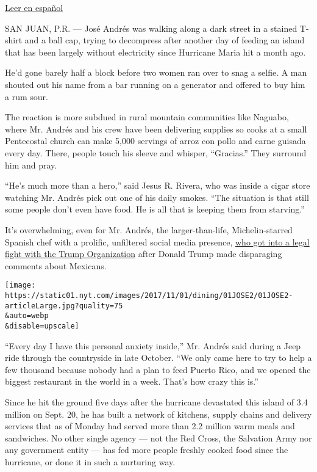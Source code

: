\href{https://www.nytimes.com/es/2017/11/03/los-chefs-que-cambian-como-se-entrega-la-ayuda-posdesastre/}{Leer
en español}

SAN JUAN, P.R. --- José Andrés was walking along a dark street in a
stained T-shirt and a ball cap, trying to decompress after another day
of feeding an island that has been largely without electricity since
Hurricane Maria hit a month ago.

He'd gone barely half a block before two women ran over to snag a
selfie. A man shouted out his name from a bar running on a generator and
offered to buy him a rum sour.

The reaction is more subdued in rural mountain communities like Naguabo,
where Mr. Andrés and his crew have been delivering supplies so cooks at
a small Pentecostal church can make 5,000 servings of arroz con pollo
and carne guisada every day. There, people touch his sleeve and whisper,
``Gracias.'' They surround him and pray.

``He's much more than a hero,'' said Jesus R. Rivera, who was inside a
cigar store watching Mr. Andrés pick out one of his daily smokes. ``The
situation is that still some people don't even have food. He is all that
is keeping them from starving.''

It's overwhelming, even for Mr. Andrés, the larger-than-life,
Michelin-starred Spanish chef with a prolific, unfiltered social media
presence,
\href{http://www.npr.org/sections/thetwo-way/2017/04/07/523004201/trump-organization-settles-lawsuit-with-chef-jos-andr-s}{who
got into a legal fight with the Trump Organization} after Donald Trump
made disparaging comments about Mexicans.

\texttt{[image: https://static01.nyt.com/images/2017/11/01/dining/01JOSE2/01JOSE2-articleLarge.jpg?quality=75\\\&auto=webp\\\&disable=upscale]}

``Every day I have this personal anxiety inside,'' Mr. Andrés said
during a Jeep ride through the countryside in late October. ``We only
came here to try to help a few thousand because nobody had a plan to
feed Puerto Rico, and we opened the biggest restaurant in the world in a
week. That's how crazy this is.''

Since he hit the ground five days after the hurricane devastated this
island of 3.4 million on Sept. 20, he has built a network of kitchens,
supply chains and delivery services that as of Monday had served more
than 2.2 million warm meals and sandwiches. No other single agency ---
not the Red Cross, the Salvation Army nor any government entity --- has
fed more people freshly cooked food since the hurricane, or done it in
such a nurturing way.

